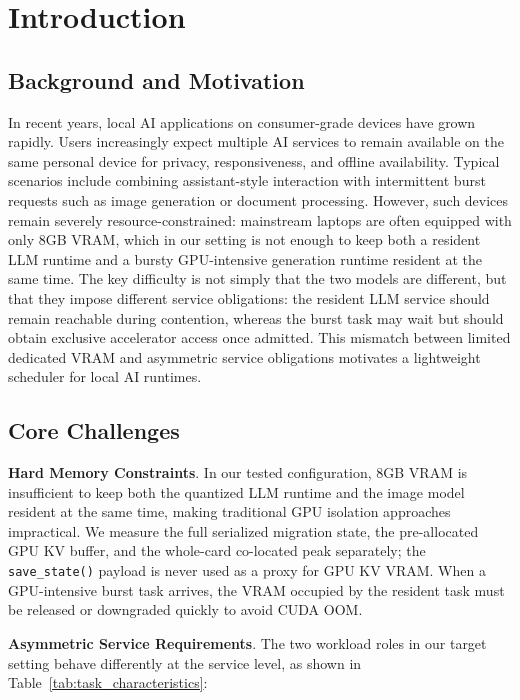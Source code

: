 \section{Introduction}

\subsection{Background and Motivation}

In recent years, local AI applications on consumer-grade devices have grown rapidly. Users increasingly expect multiple AI services to remain available on the same personal device for privacy, responsiveness, and offline availability. Typical scenarios include combining assistant-style interaction with intermittent burst requests such as image generation or document processing. However, such devices remain severely resource-constrained: mainstream laptops are often equipped with only 8GB VRAM, which in our setting is not enough to keep both a resident LLM runtime and a bursty GPU-intensive generation runtime resident at the same time. The key difficulty is not simply that the two models are different, but that they impose different service obligations: the resident LLM service should remain reachable during contention, whereas the burst task may wait but should obtain exclusive accelerator access once admitted. This mismatch between limited dedicated VRAM and asymmetric service obligations motivates a lightweight scheduler for local AI runtimes.

\subsection{Core Challenges}

\textbf{Hard Memory Constraints}. In our tested configuration, 8GB VRAM is insufficient to keep both the quantized LLM runtime and the image model resident at the same time, making traditional GPU isolation approaches impractical. We measure the full serialized migration state, the pre-allocated GPU KV buffer, and the whole-card co-located peak separately; the \texttt{save\_state()} payload is never used as a proxy for GPU KV VRAM. When a GPU-intensive burst task arrives, the VRAM occupied by the resident task must be released or downgraded quickly to avoid CUDA OOM.

\textbf{Asymmetric Service Requirements}. The two workload roles in our target setting behave differently at the service level, as shown in Table~\ref{tab:task_characteristics}:

